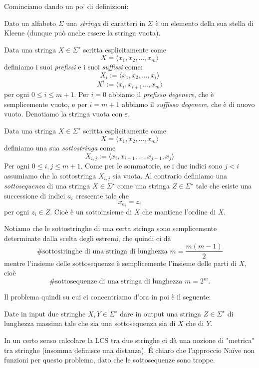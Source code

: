 \documentclass[11pt]{scrartcl}
\begin{document}
	Cominciamo dando un po' di definizioni:
	\begin{definition}[Stringa]
		Dato un alfabeto $\Sigma$ una \textit{stringa} di caratteri in $\Sigma$ è un elemento della sua stella di Kleene (dunque può anche essere la stringa vuota). 
	\end{definition}
	\begin{definition}
		Data una stringa $X\in\Sigma^\star$ scritta esplicitamente come
		$$X=\langle x_1,x_2,\dots,x_m\rangle$$
		definiamo i suoi \textit{prefissi} e i suoi \textit{suffissi} come:
		$$X_i:=\langle x_1,x_2,\dots,x_i\rangle$$
		$$X^i:=\langle x_i,x_{i+1}\dots,x_m\rangle$$
		per ogni $0\le i\le m+1$. Per $i=0$ abbiamo il \textit{prefisso degenere}, che è semplicemente vuoto, e per $i=m+1$ abbiamo il \textit{suffisso degenere}, che è di nuovo vuoto. Denotiamo la stringa vuota con $\varepsilon$.
	\end{definition}
	\begin{definition}
		Data una stringa $X\in \Sigma^\star$ scritta esplicitamente come
		$$X=\langle x_1,x_2,\dots,x_m\rangle$$
		definiamo una sua \textit{sottostringa} come
		$$X_{i,j}:=\langle x_i,x_{i+1},\dots,x_{j-1},x_{j}\rangle$$
		Per ogni $0\le i,j\le m+1$. Come per le sommatorie, se i due indici sono $j<i$ assumiamo che la sottostringa $X_{i,j}$ sia vuota. Al contrario definiamo una \textit{sottosequenza} di una stringa $X\in\Sigma^\star$ come una stringa $Z\in \Sigma^\star$ tale che esiste una successione di indici $a_i$ crescente tale che
		$$x_{a_i}=z_i$$
		per ogni $z_i\in Z$. Cioè è un sottoinsieme di $X$ che mantiene l'ordine di $X$.
	\end{definition}
	\begin{example}
		Notiamo che le sottostringhe di una certa stringa sono semplicemente determinate dalla scelta degli estremi, che quindi ci dà
		$$\#\text{sottostringhe di una stringa di lunghezza $m$}=\frac{m(m-1)}{2}$$
		mentre l'insieme delle sottosequenze è semplicemente l'insieme delle parti di $X$, cioè
		$$\#\text{sottosequenze di una stringa di lunghezza $m$}=2^m.$$
	\end{example}
	
	Il problema quindi su cui ci concentriamo d'ora in poi è il seguente:
	\begin{problem}[LCS]
		Date in input due stringhe $X,Y\in\Sigma^\star$ dare in output una stringa $Z\in\Sigma^\star$ di lunghezza massima tale che sia una sottosequenza sia di $X$ che di $Y$. 
	\end{problem}
	In un certo senso calcolare la LCS tra due stringhe ci dà una nozione di "metrica" tra stringhe (insomma definisce una distanza). \'E chiaro che l'approccio Na{\"i}ve non funzioni per questo problema, dato che le sottosequenze sono troppe.
	
\end{document}
